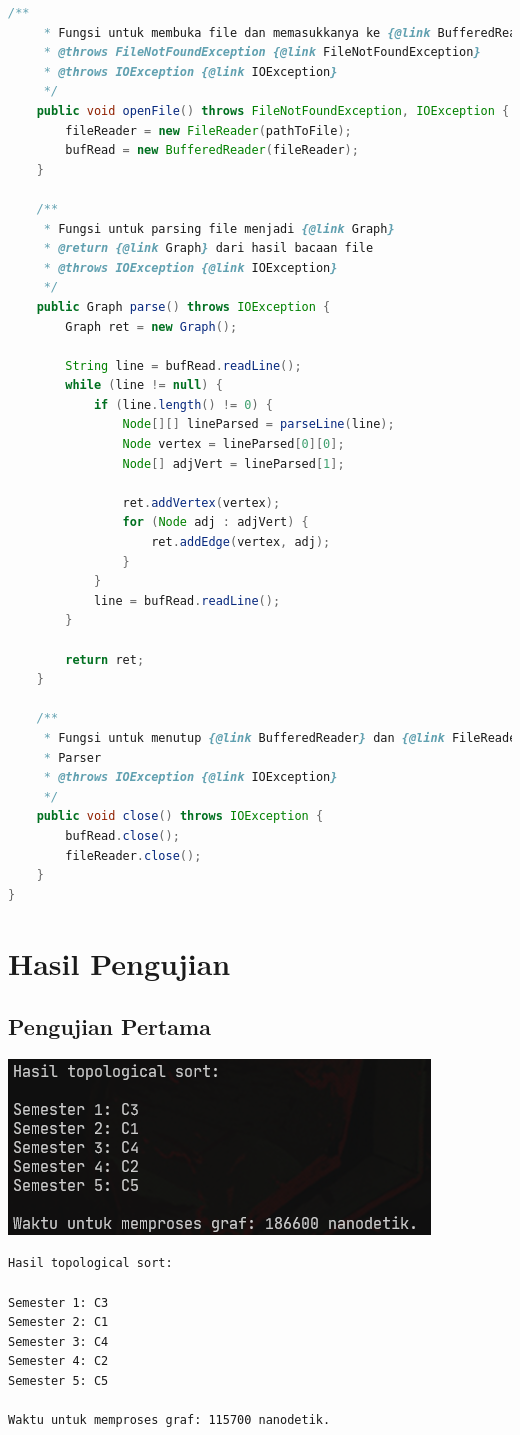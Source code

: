 \documentclass{article}
\let\origfigure\figure
\let\endorigfigure\endfigure
\renewenvironment{figure}[1][2] {
    \expandafter\origfigure\expandafter[H]
} {
    \endorigfigure
}
\begin{document}
\begin{lstlisting}[caption = lib/Parser.java, language = java]
    /**
     * Fungsi untuk membuka file dan memasukkanya ke {@link BufferedReader}
     * @throws FileNotFoundException {@link FileNotFoundException}
     * @throws IOException {@link IOException}
     */
    public void openFile() throws FileNotFoundException, IOException {
        fileReader = new FileReader(pathToFile);
        bufRead = new BufferedReader(fileReader);
    }

    /**
     * Fungsi untuk parsing file menjadi {@link Graph}
     * @return {@link Graph} dari hasil bacaan file
     * @throws IOException {@link IOException}
     */
    public Graph parse() throws IOException {
        Graph ret = new Graph();

        String line = bufRead.readLine();
        while (line != null) {
            if (line.length() != 0) {
                Node[][] lineParsed = parseLine(line);
                Node vertex = lineParsed[0][0];
                Node[] adjVert = lineParsed[1];

                ret.addVertex(vertex);
                for (Node adj : adjVert) {
                    ret.addEdge(vertex, adj);
                }
            }
            line = bufRead.readLine();
        }

        return ret;
    }

    /**
     * Fungsi untuk menutup {@link BufferedReader} dan {@link FileReader} pada
     * Parser
     * @throws IOException {@link IOException}
     */
    public void close() throws IOException {
        bufRead.close();
        fileReader.close();
    }
}
\end{lstlisting}

\section{Hasil Pengujian}
\subsection{Pengujian Pertama}
\begin{figure}
  \includegraphics[scale=0.8]{1.png}
  \caption{\textit{input}}
\end{figure}
\begin{lstlisting}[caption = \textit{output}]
Hasil topological sort:

Semester 1: C3
Semester 2: C1
Semester 3: C4
Semester 4: C2
Semester 5: C5

Waktu untuk memproses graf: 115700 nanodetik.
\end{lstlisting}
\end{document}

